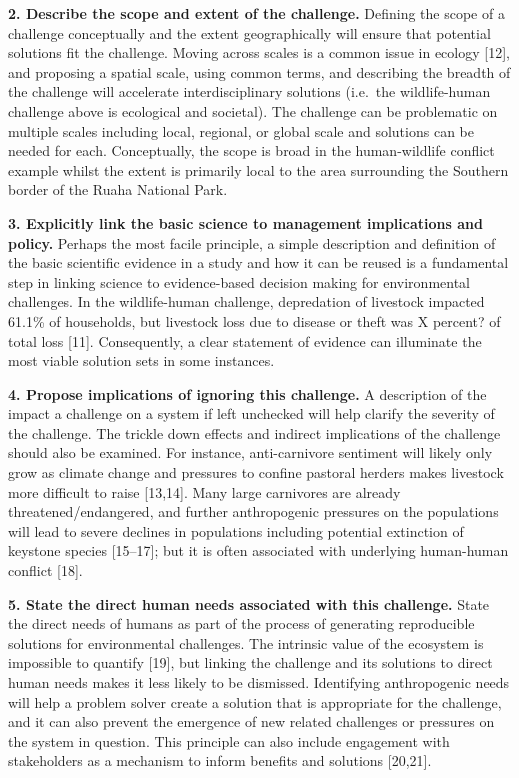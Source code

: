 \documentclass[10pt,letterpaper]{article}
\begin{document}
\textbf{2. Describe the scope and extent of the challenge.} Defining the
scope of a challenge conceptually and the extent geographically will
ensure that potential solutions fit the challenge. Moving across scales
is a common issue in ecology {[}12{]}, and proposing a spatial scale,
using common terms, and describing the breadth of the challenge will
accelerate interdisciplinary solutions (i.e.~the wildlife-human
challenge above is ecological and societal). The challenge can be
problematic on multiple scales including local, regional, or global
scale and solutions can be needed for each. Conceptually, the scope is
broad in the human-wildlife conflict example whilst the extent is
primarily local to the area surrounding the Southern border of the Ruaha
National Park.

\textbf{3. Explicitly link the basic science to management implications
and policy.} Perhaps the most facile principle, a simple description and
definition of the basic scientific evidence in a study and how it can be
reused is a fundamental step in linking science to evidence-based
decision making for environmental challenges. In the wildlife-human
challenge, depredation of livestock impacted 61.1\% of households, but
livestock loss due to disease or theft was X percent? of total loss
{[}11{]}. Consequently, a clear statement of evidence can illuminate the
most viable solution sets in some instances.

\textbf{4. Propose implications of ignoring this challenge.} A
description of the impact a challenge on a system if left unchecked will
help clarify the severity of the challenge. The trickle down effects and
indirect implications of the challenge should also be examined. For
instance, anti-carnivore sentiment will likely only grow as climate
change and pressures to confine pastoral herders makes livestock more
difficult to raise {[}13,14{]}. Many large carnivores are already
threatened/endangered, and further anthropogenic pressures on the
populations will lead to severe declines in populations including
potential extinction of keystone species {[}15--17{]}; but it is often
associated with underlying human-human conflict {[}18{]}.

\textbf{5. State the direct human needs associated with this challenge.}
State the direct needs of humans as part of the process of generating
reproducible solutions for environmental challenges. The intrinsic value
of the ecosystem is impossible to quantify {[}19{]}, but linking the
challenge and its solutions to direct human needs makes it less likely
to be dismissed. Identifying anthropogenic needs will help a problem
solver create a solution that is appropriate for the challenge, and it
can also prevent the emergence of new related challenges or pressures on
the system in question. This principle can also include engagement with
stakeholders as a mechanism to inform benefits and solutions
{[}20,21{]}.
\end{document}
